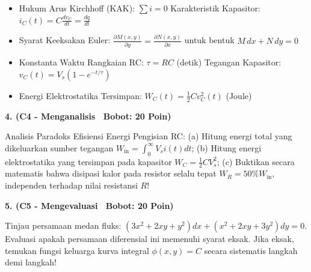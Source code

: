 \documentclass[10pt,a4paper]{article}
\begin{document}
\vfill

\begin{tcolorbox}[colback=unibblue!3,colframe=unibblue,colbacktitle=unibblue,coltitle=white,boxrule=0.6pt,arc=2pt,left=6pt,right=6pt,top=3pt,bottom=3pt,title=\textbf{\scriptsize FORMULA RUJUKAN TEKNIS \& STANDAR INDUSTRI TERKAIT}]
  \scriptsize
  \begin{itemize}[leftmargin=*, nosep]
  \item Hukum Arus Kirchhoff (KAK): $\sum i = 0$ \quad\textbar\quad Karakteristik Kapasitor: $i_C(t) = C \frac{dv_C}{dt} = \frac{dq}{dt}$
  \item Syarat Keeksakan Euler: $\frac{\partial M(x,y)}{\partial y} = \frac{\partial N(x,y)}{\partial x}$ untuk bentuk $M\,dx + N\,dy = 0$
  \item Konstanta Waktu Rangkaian RC: $\tau = R C$ (detik) \quad\textbar\quad Tegangan Kapasitor: $v_C(t) = V_s \left(1 - e^{-t/\tau}\right)$
  \item Energi Elektrostatika Tersimpan: $W_C(t) = \frac{1}{2} C v_C^2(t)$ (Joule)
\end{itemize}
\end{tcolorbox}

\newpage

\par
\vspace{1mm}

\noindent\textbf{4. (C4 - Menganalisis \textbar\ Bobot: 20 Poin)}\par\vspace{0.8mm}
{\footnotesize Analisis Paradoks Efisiensi Energi Pengisian RC: (a) Hitung energi total yang dikeluarkan sumber tegangan $W_{\text{in}} = \int_0^\infty V_s i(t) dt$; (b) Hitung energi elektrostatika yang tersimpan pada kapasitor $W_C = \frac{1}{2} C V_s^2$; (c) Buktikan secara matematis bahwa disipasi kalor pada resistor selalu tepat $W_R = 50\% W_{\text{in}}$, independen terhadap nilai resistansi $R$!}\par

\vspace{3.5mm}

\noindent\textbf{5. (C5 - Mengevaluasi \textbar\ Bobot: 20 Poin)}\par\vspace{0.8mm}
{\footnotesize Tinjau persamaan medan fluks: $(3x^2 + 2xy + y^2)dx + (x^2 + 2xy + 3y^2)dy = 0$. Evaluasi apakah persamaan diferensial ini memenuhi syarat eksak. Jika eksak, temukan fungsi keluarga kurva integral $\phi(x,y) = C$ secara sistematis langkah demi langkah!}\par
\end{document}
